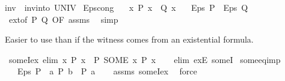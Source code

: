 \begin{isabellebody}
{\isachardoublequoteopen}inv\ {\isasymequiv}\ inv{\isacharunderscore}{\kern0pt}into\ UNIV{\isachardoublequoteclose}%
\isadelimdocument
%
\endisadelimdocument
%
\isatagdocument
%
\isamarkuptrue%
%
\endisatagdocument
{\isafolddocument}%
%
\isadelimdocument
%
\endisadelimdocument
{}\isamarkupfalse%
\ Eps{\isacharunderscore}{\kern0pt}cong{\isacharcolon}{\kern0pt}\isanewline
\ \ \ {\isachardoublequoteopen}{\isasymAnd}x{\isachardot}{\kern0pt}\ P\ x\ {\isacharequal}{\kern0pt}\ Q\ x{\isachardoublequoteclose}\isanewline
\ \ \ {\isachardoublequoteopen}Eps\ P\ {\isacharequal}{\kern0pt}\ Eps\ Q{\isachardoublequoteclose}\isanewline
%
\isadelimproof
\ \ %
\endisadelimproof
%
\isatagproof
{}\isamarkupfalse%
\ ext{\isacharbrackleft}{\kern0pt}of\ P\ Q{\isacharcomma}{\kern0pt}\ OF\ assms{\isacharbrackright}{\kern0pt}\ \isamarkupfalse%
\ simp%
\endisatagproof
{\isafoldproof}%
%
\isadelimproof
%
\endisadelimproof
%
\begin{isamarkuptext}%
Easier to use than  if the witness comes from an
  existential formula.%
\end{isamarkuptext}\isamarkuptrue%
\isamarkupfalse%
\ someI{\isacharunderscore}{\kern0pt}ex\ {\isacharbrackleft}{\kern0pt}elim{\isacharquery}{\kern0pt}{\isacharbrackright}{\kern0pt}{\isacharcolon}{\kern0pt}\ {\isachardoublequoteopen}{\isasymexists}x{\isachardot}{\kern0pt}\ P\ x\ {\isasymLongrightarrow}\ P\ {\isacharparenleft}{\kern0pt}SOME\ x{\isachardot}{\kern0pt}\ P\ x{\isacharparenright}{\kern0pt}{\isachardoublequoteclose}\isanewline
%
\isadelimproof
\ \ %
\endisadelimproof
%
\isatagproof
{}\isamarkupfalse%
\ {\isacharparenleft}{\kern0pt}elim\ exE\ someI{\isacharparenright}{\kern0pt}%
\endisatagproof
{\isafoldproof}%
%
\isadelimproof
\isanewline
%
\endisadelimproof
\isanewline
{}\isamarkupfalse%
\ some{\isacharunderscore}{\kern0pt}eq{\isacharunderscore}{\kern0pt}imp{\isacharcolon}{\kern0pt}\isanewline
\ \ \ {\isachardoublequoteopen}Eps\ P\ {\isacharequal}{\kern0pt}\ a{\isachardoublequoteclose}\ {\isachardoublequoteopen}P\ b{\isachardoublequoteclose}\ \ {\isachardoublequoteopen}P\ a{\isachardoublequoteclose}\isanewline
%
\isadelimproof
\ \ %
\endisadelimproof
%
\isatagproof
{}\isamarkupfalse%
\ assms\ someI{\isacharunderscore}{\kern0pt}ex\ \isamarkupfalse%
\ force%
\endisatagproof
{\isafoldproof}%
%
\isadelimproof
%
\endisadelimproof

\end{isabellebody}
